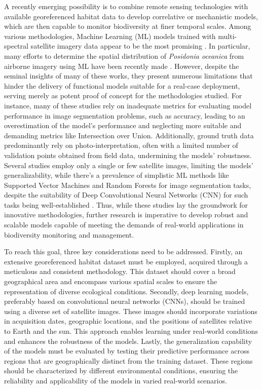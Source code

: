 A recently emerging possibility is to combine remote sensing technologies with
available georeferenced habitat data to develop correlative or mechanistic
models, which are then capable to monitor biodiversity at finer temporal
scales.  Among various methodologies, Machine Learning (ML) models trained with
multi-spectral satellite imagery data appear to be the most promising
\cite{Zhang2013,Senecal2019,Wicaksono2019,Gudzius2021}. In particular, many
efforts to determine the spatial distribution
of \textit{Posidonia oceanica} from airborne imagery using ML have been
recently made
\cite{Chand2022,Jeon2021,case_study_Aegean_and_ionian_seas,Ariasari2019,comp_study_new_zeeld,MederosBarrera2022,Coffer2020,Marcello2018,Traganos2018c,Poursanidis2019,Duffy2019,Islam2019,Poursanidis2018,Traganos2018b,Traganos2018d,Bakirman2020,Kellaris2019,chowdhury2023ai}.
However, despite the seminal insights of many of these works, they present
numerous limitations that hinder the delivery of functional models suitable for
a real-case deployment, serving merely as potent proof of concept for the
methodologies studied. For instance, many of these studies rely on inadequate
metrics
for evaluating model performance in image segmentation problems, such as
accuracy, leading to an overestimation of the model's performance and
neglecting more suitable and demanding metrics like Intersection over Union.
Additionally,
ground truth data predominantly rely on photo-interpretation, often with a
limited number of validation points obtained from field data, undermining the
models' robustness. Several studies employ only a single
or few satellite images, limiting the models' generalizability, while there's a
prevalence of simplistic ML methods like Supported Vector Machines
and Random Forests for image segmentation tasks, despite the suitability of
Deep Convolutional Neural Networks (CNN) for such tasks being well-established
\cite{Zeiler2014,Milletari2016}.
Thus, while these studies lay the groundwork for innovative methodologies,
further research is imperative to develop robust and scalable models capable of
meeting the demands of real-world applications in biodiversity monitoring and
management.

To reach this goal, three key considerations need to be addressed.
Firstly, an extensive georeferenced habitat dataset must be employed, acquired
through a meticulous and consistent methodology. This dataset should cover a
broad geographical area and encompass various spatial scales to ensure the
representation of diverse ecological conditions. Secondly, deep learning
models, preferably based on convolutional neural networks (CNNs), should be
trained using a diverse set of satellite images. These images should
incorporate variations in acquisition dates, geographic locations, and the
positions of satellites relative to Earth and the sun. This approach enables
learning under real-world conditions and enhances the robustness of the models.
Lastly, the generalization capability of the models must be evaluated by
testing their predictive performance across regions that are geographically
distinct from the training dataset. These regions should be characterized by
different environmental conditions, ensuring the reliability and applicability
of the models in varied real-world scenarios.

